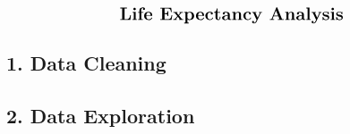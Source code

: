 \documentclass[15pt,a4paper]{report}
\begin{document}
\[
\Large \textbf{Life Expectancy Analysis}\]
\subsection*{1. Data Cleaning}
\subsection*{2. Data Exploration}
\end{document}

